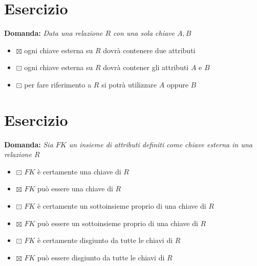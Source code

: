 \documentclass[12pt]{article}
\begin{document}
\section{Esercizio}
\textbf{Domanda: }\textit{Data una relazione $R$ con una sola chiave $A,B$}
\begin{itemize}
    \item $\boxtimes$ ogni chiave esterna su $R$ dovrà contenere due attributi
    \item $\boxdot$ ogni chiave esterna su $R$ dovrà contener gli attributi $A$ e $B$
    \item $\boxdot$ per fare riferimento a $R$ si potrà utilizzare $A$ oppure $B$
\end{itemize}
\section{Esercizio}
\textbf{Domanda: }\textit{Sia $FK$ un insieme di attributi definiti come chiave esterna in una relazione $R$}
\begin{itemize}
    \item $\boxdot$ $FK$ è certamente una chiave di $R$ 
    \item $\boxtimes$ $FK$ può essere una chiave di $R$ 
    \item $\boxdot$ $FK$ è certamente un sottoinsieme proprio di una chiave di $R$ 
    \item $\boxtimes$ $FK$ può essere un sottoinsieme proprio di una chiave di $R$ 
    \item $\boxdot$ $FK$ è certamente disgiunto da tutte le chiavi di $R$ 
    \item $\boxtimes$ $FK$ può essere disgiunto da tutte le chiavi di $R$
\end{itemize}
\end{document}

